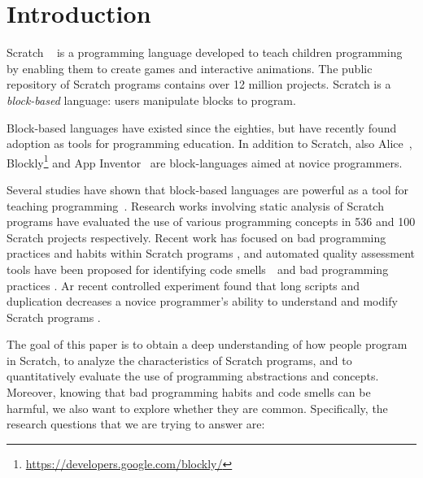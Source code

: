 \documentclass{sig-alternate}
\begin{document}



\section{Introduction}

Scratch ~\cite{resnick_scratch:_2009} is a programming language developed to teach children programming by enabling them to create games and interactive animations. The public repository of Scratch programs contains over 12 million projects. Scratch is a \emph{block-based} language: users manipulate blocks to program.

Block-based languages have existed since the eighties, but have recently found adoption as tools for programming education. In addition to Scratch, also Alice~\cite{conway_alice:_1994}, Blockly\footnote{\url{https://developers.google.com/blockly/}} and App Inventor~\cite{wolber_app_2011} are block-languages aimed at novice programmers.

Several studies have shown that block-based languages are powerful as a tool for teaching programming~\cite{meerbaum-salant_learning_2010, b._moskal_evaluating_2005,cooper_teaching_2003,price_comparing_2015}. Research works involving static analysis of Scratch programs \cite{Maloney_2008,moreno_automatic_2014} have evaluated the use of various programming concepts in 536 and 100 Scratch projects respectively. Recent work has focused on bad programming practices and habits within Scratch programs \cite{Meerbaum_habits_2011}, and automated quality assessment tools have been proposed for identifying code smells~\cite{fowler_refactoring:_1999}~and bad programming practices \cite{boe_hairball:_2013,moreno_automatic_2014}. Ar recent controlled experiment found that long scripts and duplication decreases a novice programmer's ability to understand and modify Scratch programs \cite{hermans_2016}.

The goal of this paper is to obtain a deep understanding of how people program in Scratch, to analyze the characteristics of Scratch programs, and to quantitatively evaluate the use of programming abstractions and concepts. Moreover, knowing that bad programming habits and code smells can be harmful, we also want to explore whether they are common. Specifically, the research questions that we are trying to answer are:
\end{document}
